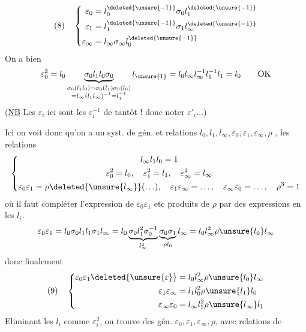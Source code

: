 \[
(8)\quad\left\{\begin{aligned}
\varepsilon_0&=l_0^{\deleted{\unsure{-1}}}\sigma_0l_1^{\deleted{\unsure{-1}}}\\
\varepsilon_1&=l_1^{\deleted{\unsure{-1}}}\sigma_1l_\infty^{\deleted{\unsure{-1}}}\\
\varepsilon_\infty&=l_\infty\sigma_\infty l_0^{\deleted{\unsure{-1}}}
\end{aligned}\right.
\]
On a bien
\[
\varepsilon_0^2=l_0\underbrace{\sigma_0l_1l_0\sigma_0}_{\substack{\sigma_0(l_1l_0)=\sigma_0(l_1)\sigma_0(l_0)\\=l_\infty(l_1l_\infty)^{-1}=l_1^{-1}}}l_{\unsure{1}}=l_0l_\infty l_\infty^{-1}l_1^{-1}l_1=l_0\qquad\text{OK}
\]
(\uline{NB} Les $\varepsilon_i$ ici sont les $\varepsilon_i^{-1}$ de tantôt !    donc noter $\varepsilon'_i\ldots$)

Ici on voit donc qu'on a un syst. de gén. et relations  $l_0,l_1,l_\infty,\varepsilon_0,\varepsilon_1,\varepsilon_\infty,\rho$ , les relations
\[
\left\{\begin{gathered}
l_\infty l_1l_0=1\\
\varepsilon_0^2=l_0,\quad\varepsilon_1^2=l_1,\quad\varepsilon_\infty^2=l_\infty\\
\varepsilon_0\varepsilon_1=\rho\deleted{\unsure{l_\infty}}(\ldots),\quad\varepsilon_1\varepsilon_\infty=\ldots,\quad\varepsilon_\infty\varepsilon_0=\ldots,\quad\rho^3=1
\end{gathered}\right.
\]
où il faut compléter l'expression de $\varepsilon_0\varepsilon_1$ etc  produits de $\rho$ par des expressions en les $l_i$.
\deleted{\[
\varepsilon_0\varepsilon_1=l_0\sigma_1l_1
\]}
\[
\varepsilon_0\varepsilon_1=l_0\sigma_0l_1l_1\sigma_1l_\infty
=l_0\underbrace{\sigma_0l_1^2\sigma_0^{-1}}_{l_\infty^2}\underbrace{\sigma_0\sigma_1}_{\rho l_0}l_\infty
=l_0l_\infty^2\rho\unsure{l_0}l_\infty
\]
donc finalement
\[
(9)\quad\left\{\begin{aligned}
\varepsilon_0\varepsilon_1\deleted{\unsure{\varepsilon}}&=l_0l_\infty^2\rho\unsure{l_0}l_\infty\\
\varepsilon_1\varepsilon_\infty&=l_1l_0^2\rho\unsure{l_1}l_0\\
\varepsilon_\infty\varepsilon_0&=l_\infty l_1^2\rho\unsure{l_\infty}l_1
\end{aligned}\right.
\]
Eliminant les $l_i$ comme $\varepsilon_i^2$, on trouve des gén. $\varepsilon_0,\varepsilon_1,\varepsilon_\infty,\rho$, avec relations de 
